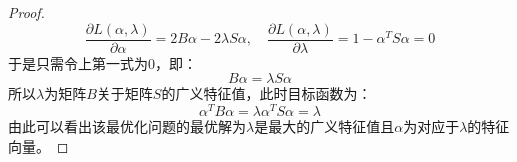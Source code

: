\begin{proof}
\begin{equation*}
		\frac{\partial L(\alpha,\lambda)}{\partial\alpha}=2B\alpha-2\lambda S\alpha,\quad\frac{\partial L(\alpha,\lambda)}{\partial\lambda}=1-\alpha^TS\alpha=0
	\end{equation*}
	于是只需令上第一式为$0$，即：
	\begin{equation*}
		B\alpha=\lambda S\alpha
	\end{equation*}
	所以$\lambda$为矩阵$B$关于矩阵$S$的广义特征值，此时目标函数为：
	\begin{equation*}
		\alpha^TB\alpha=\lambda\alpha^TS\alpha=\lambda
	\end{equation*}
	由此可以看出该最优化问题的最优解为$\lambda$是最大的广义特征值且$\alpha$为对应于$\lambda$的特征向量。
\end{proof}